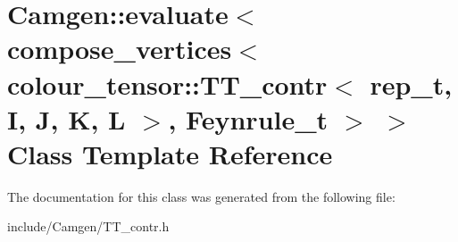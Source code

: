 \hypertarget{a00175}{\section{Camgen\-:\-:evaluate$<$ compose\-\_\-vertices$<$ colour\-\_\-tensor\-:\-:T\-T\-\_\-contr$<$ rep\-\_\-t, I, J, K, L $>$, Feynrule\-\_\-t $>$ $>$ Class Template Reference}
\label{a00175}
}


The documentation for this class was generated from the following file\-:\begin{DoxyCompactItemize}
\item 
include/\-Camgen/T\-T\-\_\-contr.\-h\end{DoxyCompactItemize}

